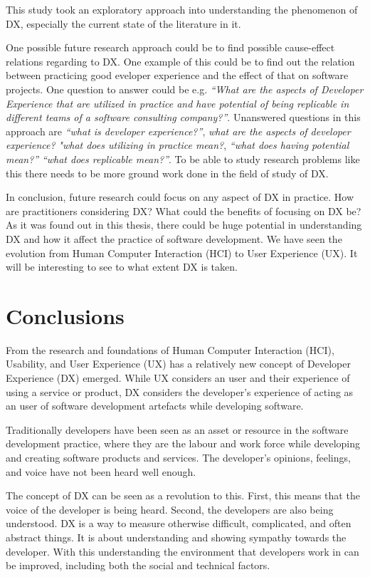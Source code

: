 \documentclass[english, 12pt, a4paper, sci, utf8, a-1b, online]{aaltothesis}
\begin{document}
This study took an exploratory approach into understanding the phenomenon of DX, especially the current state of the literature in it.

One possible future research approach could be to find possible cause-effect relations regarding to DX. One example of this could be to find out the relation between practicing good eveloper experience and the effect of that on software projects. One question to answer could be e.g. \textit{``What are the aspects of Developer Experience that are utilized in practice and have potential of being replicable in different teams of a software consulting company?''}. Unanswered questions in this approach are \textit{``what is developer experience?''}, \textit{what are the aspects of developer experience?} \textit{"what does utilizing in practice mean?}, \textit{``what does having potential mean?''} \textit{``what does replicable mean?''}. To be able to study research problems like this there needs to be more ground work done in the field of study of DX.

In conclusion, future research could focus on any aspect of DX in practice. How are practitioners considering DX? What could the benefits of focusing on DX be? As it was found out in this thesis, there could be huge potential in understanding DX and how it affect the practice of software development. We have seen the evolution from Human Computer Interaction (HCI) to User Experience (UX). It will be interesting to see to what extent DX is taken.

\clearpage
\section{Conclusions} \label{section:conclusions}

From the research and foundations of Human Computer Interaction (HCI), Usability, and User Experience (UX) has a relatively new concept of Developer Experience (DX) emerged. While UX considers an user and their experience of using a service or product, DX considers the developer's experience of acting as an user of software development artefacts while developing software.

Traditionally developers have been seen as an asset or resource in the software development practice, where they are the labour and work force while developing and creating software products and services. The developer's opinions, feelings, and voice have not been heard well enough.

The concept of DX can be seen as a revolution to this. First, this means that the voice of the developer is being heard. Second, the developers are also being understood. DX is a way to measure otherwise difficult, complicated, and often abstract things. It is about understanding and showing sympathy towards the developer. With this understanding the environment that developers work in can be improved, including both the social and technical factors.
\end{document}
